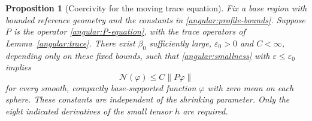 \documentclass[11pt,a4paper]{article}
\newtheorem{proposition}[lemma]{Proposition}
\newcommand{\eps}{\varepsilon}
\numberwithin{equation}{section}
\begin{document}
\begin{proposition}[Coercivity for the moving trace equation]
\label{angular:coercivity}
Fix a base region with bounded reference geometry and the constants in
\eqref{angular:profile-bounds}.  Suppose $P$ is the operator
\eqref{angular:P-equation}, with the trace operators of
Lemma~\ref{angular:trace}.  There exist $\beta_0$ sufficiently large,
$\eps_0>0$ and $C<\infty$, depending only on these fixed bounds, such that
\eqref{angular:smallness} with $\eps\le\eps_0$ implies
\begin{equation}\label{angular:coercive-estimate}
 \mathcal N(\varphi)\le C\|P\varphi\|
\end{equation}
for every smooth, compactly base-supported function $\varphi$ with
zero mean on each sphere.  These constants are independent of the
shrinking parameter.  Only the eight indicated derivatives of the small
tensor $h$ are required.
\end{proposition}
\end{document}
